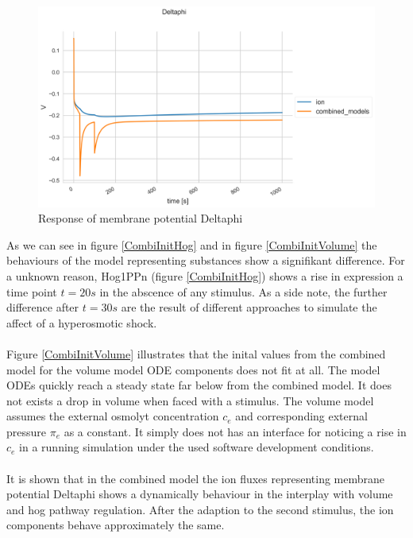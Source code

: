 \begin{figure}[h!]
	\begin{center}
		\begin{minipage}{0,8\textwidth}
			
			\includegraphics[width=\textwidth]{picture/Deltaphi_71.png}
			\caption{Response of membrane potential Deltaphi} 
			\label{CombiInitIon} 
		\end{minipage}
	\end{center}
\end{figure}
As we can see in figure \ref{CombiInitHog} and in figure \ref{CombiInitVolume} the behaviours of the model representing substances show a signifikant difference. For a unknown reason, Hog1PPn (figure \ref{CombiInitHog}) shows a rise in expression a time point $t=20s$ in the abscence of any stimulus. As a side note, the further difference after $t=30s$ are the result of different approaches to simulate the affect of a hyperosmotic shock. \\\\
Figure \ref{CombiInitVolume} illustrates that the inital values from the combined model for the volume model ODE components does not fit at all. The model 
ODEs quickly reach a steady state far below from the combined model. It does not exists a drop in volume when faced with a stimulus. The volume model assumes the external osmolyt concentration $c_e$ and corresponding external pressure $\pi_e$ as a constant. It simply does not has an interface for noticing a rise in $c_e$ in a running simulation under the used software development conditions.\\\\
It is shown that in the combined model the ion fluxes representing membrane potential Deltaphi shows a dynamically behaviour in the interplay with volume and hog pathway regulation. After the adaption to the second stimulus, the ion components behave approximately the same.
\newpage
